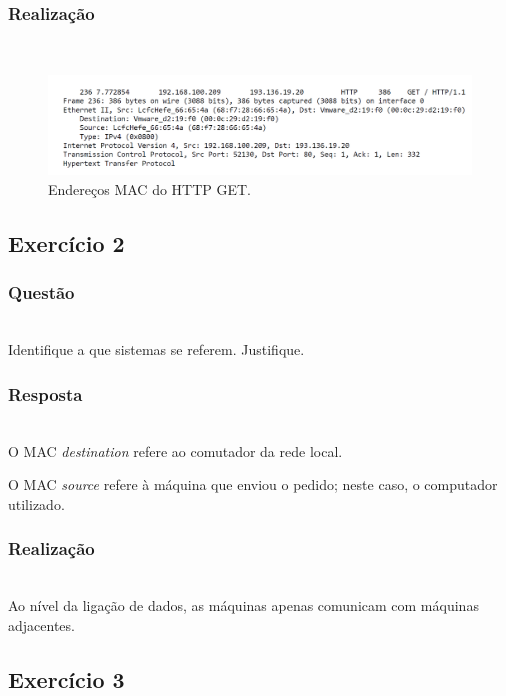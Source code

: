 \documentclass{llncs}
\begin{document}
\subsubsection{Realização}\rule[-10pt]{0pt}{10pt}\\

\begin{figure}
  \begin{center}
  \includegraphics[scale=0.35]{imagens/MACAddrGET.png} 
  \end{center}
  \caption{Endereços MAC do HTTP GET.}
  \label{fig:mac_addr}
\end{figure} 

\clearpage
\subsection{Exercício 2}
\subsubsection{Questão}\rule[-10pt]{0pt}{10pt}\\

Identifique a que sistemas se referem. Justifique.

\subsubsection{Resposta}\rule[-10pt]{0pt}{10pt}\\

O MAC \textit{destination} refere ao comutador da rede local.

O MAC \textit{source} refere à máquina que enviou o pedido; neste caso, o computador utilizado.

\subsubsection{Realização}\rule[-10pt]{0pt}{10pt}\\

Ao nível da ligação de dados, as máquinas apenas comunicam com máquinas adjacentes.

\clearpage
\subsection{Exercício 3}
\end{document}
